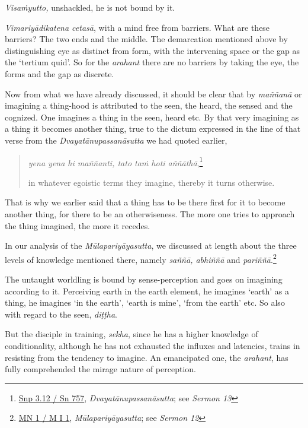 \emph{Visaṁyutto,} unshackled, he is not bound by it.

\emph{Vimariyādikatena cetasā}, with a mind free from barriers. What are these barriers? The two ends and the middle. The demarcation mentioned above by distinguishing eye as distinct from form, with the intervening space or the gap as the `tertium quid'. So for the \emph{arahant} there are no barriers by taking the eye, the forms and the gap as discrete.

Now from what we have already discussed, it should be clear that by \emph{maññanā} or imagining a thing-hood is attributed to the seen, the heard, the sensed and the cognized. One imagines a thing in the seen, heard etc. By that very imagining as a thing it becomes another thing, true to the dictum expressed in the line of that verse from the \emph{Dvayatānupassanāsutta} we had quoted earlier,

\begin{quote}
\emph{yena yena hi maññanti, tato taṁ hoti aññāthā},\footnote{\href{https://suttacentral.net/snp3.12/pli/ms}{Snp 3.12 / Sn 757}, \emph{Dvayatānupassanāsutta}; see \emph{Sermon 13}}

in whatever egoistic terms they imagine, thereby it turns otherwise.
\end{quote}

That is why we earlier said that a thing has to be there first for it to become another thing, for there to be an otherwiseness. The more one tries to approach the thing imagined, the more it recedes.

In our analysis of the \emph{Mūlapariyāyasutta}, we discussed at length about the three levels of knowledge mentioned there, namely \emph{saññā, abhiññā} and \emph{pariññā}.\footnote{\href{https://suttacentral.net/mn1/pli/ms}{MN 1 / M I 1}, \emph{Mūlapariyāyasutta}; see \emph{Sermon 12}}

The untaught worldling is bound by sense-perception and goes on imagining according to it. Perceiving earth in the earth element, he imagines `earth' as a thing, he imagines `in the earth', `earth is mine', `from the earth' etc. So also with regard to the seen, \emph{diṭṭha}.

But the disciple in training, \emph{sekha}, since he has a higher knowledge of conditionality, although he has not exhausted the influxes and latencies, trains in resisting from the tendency to imagine. An emancipated one, the \emph{arahant}, has fully comprehended the mirage nature of perception.

